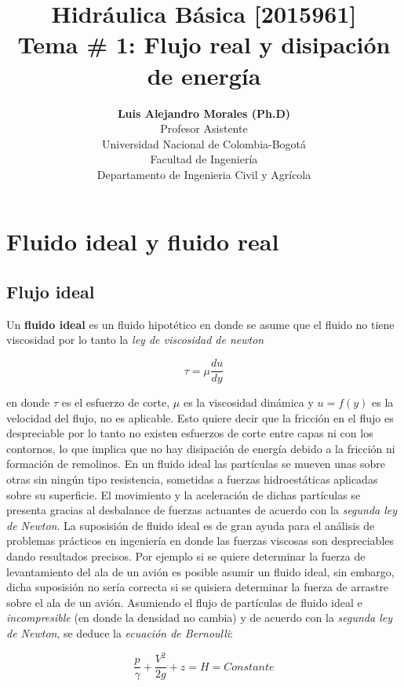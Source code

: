 \documentclass[11pt, oneside]{article}
\title{Hidr\'aulica B\'asica [2015961] \\ \textbf{Tema \# 1: Flujo real y disipaci\'on de energ\'ia}}
\author{\textbf{Luis Alejandro Morales (Ph.D)}\\ \vspace{0.4cm} Profesor Asistente \\ Universidad Nacional de Colombia-Bogot\'a\\Facultad de Ingenier\'ia \\ Departamento de Ingenieria Civil y Agr\'icola}
\date{}
\begin{document}
\maketitle
\tableofcontents


\section{Fluido ideal y fluido real} %
\subsection{Flujo ideal}
Un \textbf{fluido ideal} es un fluido hipot\'etico en donde  se asume que el fluido no tiene viscosidad por lo tanto la \emph{ley de viscosidad de newton} 

\begin{equation}
\tau = \mu \frac{du}{dy}
\label{vis}
\end{equation}

en donde $\tau$ es el esfuerzo de corte, $\mu$ es la viscosidad din\'amica y $u=f(y)$ es la velocidad del flujo, no es aplicable. Esto quiere decir que la fricci\'on en el flujo es despreciable por lo tanto  no existen esfuerzos de corte entre capas ni con los contornos, lo que implica que no hay disipaci\'on de energ\'ia debido a la fricci\'on ni formaci\'on de remolinos. En un fluido ideal las part\'iculas se mueven unas sobre otras sin ning\'un tipo resistencia, sometidas a fuerzas hidroest\'aticas aplicadas sobre su superficie. El movimiento y la aceleraci\'on de dichas part\'iculas se presenta gracias al desbalance de fuerzas actuantes de acuerdo con la \emph{segunda ley de Newton}. La suposisi\'on de fluido ideal es de gran ayuda para el an\'alisis de problemas pr\'acticos en ingenier\'ia en donde las fuerzas viscosas son despreciables dando resultados precisos. Por ejemplo si se quiere determinar la fuerza de levantamiento del ala de un avi\'on es posible asumir un fluido ideal, sin embargo, dicha suposisi\'on no ser\'ia correcta si se quisiera determinar la fuerza de arrastre sobre el ala de un avi\'on. Asumiendo el flujo de part\'iculas de fluido ideal e \emph{incompresible} (en donde la densidad no cambia) y de acuerdo con la \emph{segunda ley de Newton}, se deduce la \emph{ecuaci\'on de Bernoulli}:

\begin{equation}
\frac{p}{\gamma} + \frac{V^2}{2g}+z = H = Constante
\label{bernu}
\end{equation}
\end{document}
